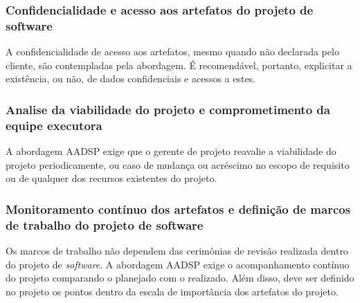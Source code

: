 \documentclass{acm_proc_article-sp}
\begin{document}
\subsubsection*{Confidencialidade e acesso aos artefatos do projeto de software}
A confidencialidade de acesso aos artefatos, mesmo quando não declarada pelo cliente, são contempladas pela abordagem. É recomendável, portanto, explicitar a existência, ou não, de dados confidenciais e acessos a estes\cite{aadsp:hibirdo}.

\subsubsection*{Analise da viabilidade do projeto e comprometimento da equipe executora}
A abordagem AADSP exige que o gerente de projeto reavalie a viabilidade do projeto periodicamente, ou caso de mudança ou acréscimo no escopo de requisito ou de qualquer dos recursos existentes do projeto\cite{aadsp:hibirdo}.

\subsubsection*{Monitoramento contínuo dos artefatos e definição de marcos de trabalho do projeto de software}
Os marcos de trabalho não dependem das cerimônias de revisão realizada dentro do projeto de \textit{software}.  A abordagem AADSP exige o acompanhamento contínuo do projeto comparando o planejado com o realizado. Além disso, deve ser definido no projeto os pontos dentro da escala de importância dos artefatos do projeto. 
\end{document}
